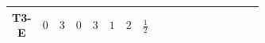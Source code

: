 \documentclass[8pt]{article}
\begin{document}
\begin{landscape}
\begin{longtable}{@{}cccccccc >{\raggedright\arraybackslash}p{0.21\linewidth} >{\raggedright\arraybackslash}p{0.21\linewidth} >{\raggedright\arraybackslash}p{0.21\linewidth}@{}}
\midrule
T3-E & $0$ & $3$ & $0$ & $3$ & $1$ & $2$ & $\frac{1}{2}$ & \scriptsize\adjustbox{max width=\linewidth}{$\begin{gathered} +D_{\mu _1}\left(S_{2,j_1}\right){}^{\dagger } D_{\mu _1}\left(S_{2,j_1}\right)\end{gathered}$} & \scriptsize\adjustbox{max width=\linewidth}{$\begin{gathered} -\frac{\hbar  B_{\mu _1\mu _2}^2}{2 \epsilon }\end{gathered}$} & \scriptsize\adjustbox{max width=\linewidth}{$\begin{gathered} -\frac{\hbar  \left(W_{\mu _1\mu _2}^{A_1}\right){}^2}{2 \epsilon }\end{gathered}$} \\
\midrule
\bottomrule
\end{longtable}
\clearpage

\end{landscape}
\end{document}

